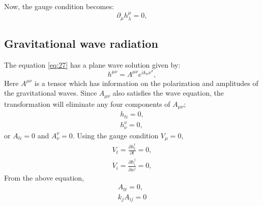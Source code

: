\documentclass{ttuthes2007}
\begin{document}
Now, the gauge condition becomes:
\begin{equation}\label{eq:28}
\partial _\mu h^\mu _\lambda = 0,
\end{equation}


\subsection{Gravitational wave radiation}
The equation \ref{eq:27} has a plane wave solution given by:
\begin{equation} \label{eq:30}
h^{\mu \nu} = A^{\mu \nu}e^{ik_\sigma x^\sigma},
\end{equation}
Here $A^{\mu \nu}$ is a tensor which has information on
the polarization and amplitudes of the gravitational waves.
Since $A_{\mu \nu}$ also satisfies the wave equation, the transformation will
eliminate any four components of $A_{\mu \nu}$;
\begin{equation}
\begin{aligned}
h_{ti}=0, \\
h^\nu_\nu =0,
\end{aligned}
\end{equation}
or $A_{ti}=0$ and $A_\nu ^\nu=0$. Using the gauge condition $V_\mu =0$,
\begin{equation}
\begin{aligned}
V_t=\frac{\partial h^t _t}{\partial t}=0,\\
V_i=\frac{\partial h^j _i}{\partial x^j}=0,
\end{aligned}
\end{equation}
From the above equation,
\begin{equation}                                                                
\begin{aligned} 
A_{tt}=0, \\
k_j A_{ij}=0
\end{aligned}                                                                   
\end{equation} 
\end{document}
